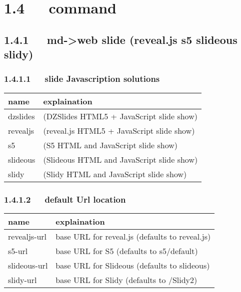 \documentclass[letterpaper,12pt,english]{sphinxmanual}
\begin{document}
\section{1.4   command}
\label{\detokenize{001software/001install/pandoc:command}}

\subsection{1.4.1   md-\textgreater{}web slide (reveal.js s5 slideous slidy)}
\label{\detokenize{001software/001install/pandoc:md-web-slide-reveal-js-s5-slideous-slidy}}

\subsubsection{1.4.1.1   slide Javascription solutions}
\label{\detokenize{001software/001install/pandoc:slide-javascription-solutions}}

\begin{savenotes}\sphinxattablestart
\centering
\begin{tabulary}{\linewidth}[t]{|T|T|}
\hline
\sphinxstyletheadfamily 
name
&\sphinxstyletheadfamily 
explaination
\\
\hline
dzslides
&
(DZSlides HTML5 + JavaScript slide show)
\\
\hline
revealjs
&
(reveal.js HTML5 + JavaScript slide show)
\\
\hline
s5
&
(S5 HTML and JavaScript slide show)
\\
\hline
slideous
&
(Slideous HTML and JavaScript slide show)
\\
\hline
slidy
&
(Slidy HTML and JavaScript slide show)
\\
\hline
\end{tabulary}
\par
\sphinxattableend\end{savenotes}


\subsubsection{1.4.1.2   default Url location}
\label{\detokenize{001software/001install/pandoc:default-url-location}}

\begin{savenotes}\sphinxattablestart
\centering
\begin{tabulary}{\linewidth}[t]{|T|T|}
\hline
\sphinxstyletheadfamily 
name
&\sphinxstyletheadfamily 
explaination
\\
\hline
revealjs-url
&
base URL for reveal.js
(defaults to reveal.js)
\\
\hline
s5-url
&
base URL for S5 (defaults to
s5/default)
\\
\hline
slideous-url
&
base URL for Slideous
(defaults to slideous)
\\
\hline
slidy-url
&
base URL for Slidy (defaults
to
/Slidy2)
\\
\hline
\end{tabulary}
\par
\sphinxattableend\end{savenotes}
\end{document}
